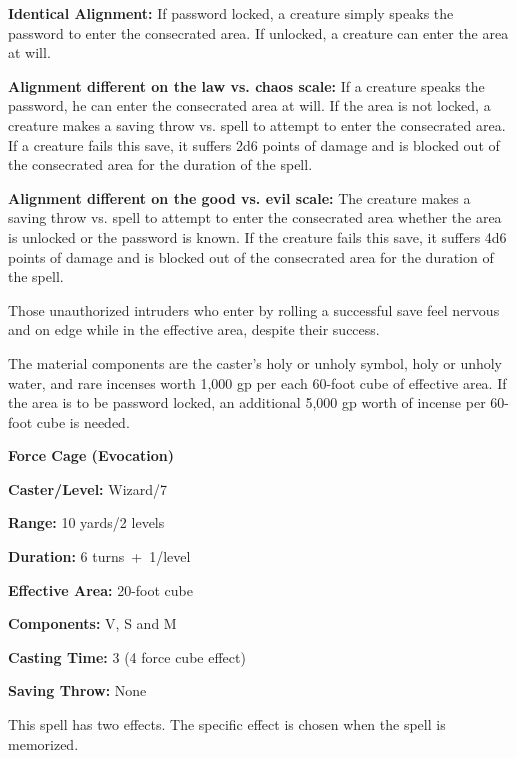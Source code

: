 \begin{multicols}{2}
\textbf{Identical Alignment:} If password locked, a creature simply speaks the password to enter the consecrated area.  If unlocked, a creature can enter the area at will.

\textbf{Alignment different on the law vs. chaos scale:} If a creature speaks the password, he can enter the consecrated area at will.  If the area is not locked, a creature makes a saving throw vs. spell to attempt to enter the consecrated area.  If a creature fails this save, it suffers 2d6 points of damage and is blocked out of the consecrated area for the duration of the spell.  

\textbf{Alignment different on the good vs. evil scale:} The creature makes a saving throw vs. spell to attempt to enter the consecrated area whether the area is unlocked or the password is known.  If the creature fails this save, it suffers 4d6 points of damage and is blocked out of the consecrated area for the duration of the spell. 

Those unauthorized intruders who enter by rolling a successful save feel nervous and on edge while in the effective area, despite their success.

The material components are the caster's holy or unholy symbol, holy or unholy water, and rare incenses worth 1,000 gp per each 60-foot cube of effective area.  If the area is to be password locked, an additional 5,000 gp worth of incense per 60-foot cube is needed.

\vspace{1em}

\noindent
\begin{minipage}{\columnwidth}

\noindent \textbf{Force Cage (Evocation)}

\noindent \textbf{Caster/Level:} Wizard/7

\noindent \textbf{Range:} 10 yards/2 levels

\noindent \textbf{Duration:} 6 turns~+~1/level

\noindent \textbf{Effective Area:} 20-foot cube

\noindent \textbf{Components:} V, S and M

\noindent \textbf{Casting Time:} 3 (4 force cube effect)

\noindent \textbf{Saving Throw:} None

\end{minipage}

This spell has two effects.  The specific effect is chosen when the spell is memorized.


\end{multicols}
